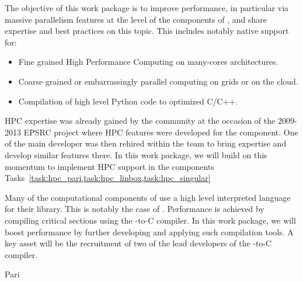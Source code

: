 \addtocounter{wpno}{1}
\begin{Workpackage}{\thewpno}
\WPTitle{\wpname{\thewpno}}

\begin{WPObjectives}
  The objective of this work package is to improve performance, in
  particular via massive parallelism features at the level of the
  components of \TheProject, and share expertise and best practices on
  this topic. This includes notably native support for:
  \begin{itemize}
  \item Fine grained High Performance Computing on many-cores
    architectures.
  \item Coarse grained or embarrassingly parallel computing on grids
    or on the cloud.
  \item Compilation of high level Python code to optimized C/C++.
  \end{itemize}
\end{WPObjectives}

\begin{WPDescription}
  HPC expertise was already gained by the community at the occasion of
  the 2009-2013 EPSRC project where HPC features were developed for
  the \GAP component. One of the main developer was then rehired
  within the \Singular team to bring expertise and develop similar
  features there.  In this work package, we will build on this
  momentum to implement HPC support in the components
  Tasks~\ref{task:hpc_pari,task:hpc_linbox,task:hpc_singular}

  Many of the computational components of \TheProject use a high level
  interpreted language for their library. This is notably the case of
  \Sage. Performance is achieved by compiling critical sections using
  the \Cython \Python-to-C compiler. In this work package, we will
  boost performance by further developing and applying such
  compilation tools. A key asset will be the recruitment of two of the
  lead developers of the \Pythran \Python-to-C compiler.
\end{WPDescription}

\begin{task}{Pari}
  \label{task:hpc_pari}
\end{task}


\end{Workpackage}

